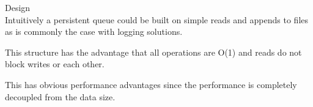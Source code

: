 \begin{frame}[plain,t]{Design} %
     \\
    \vspace{2ex}
    Intuitively a persistent queue could be built on simple reads and appends to files as is commonly the case with logging solutions. 
    
    \vspace{2ex}
    This structure has the advantage that all operations are O(1) and reads do not block writes or each other. 
    
    \vspace{2ex}
    This has obvious performance advantages since the performance is completely decoupled from the data size.
    
    
    
\end{frame}
